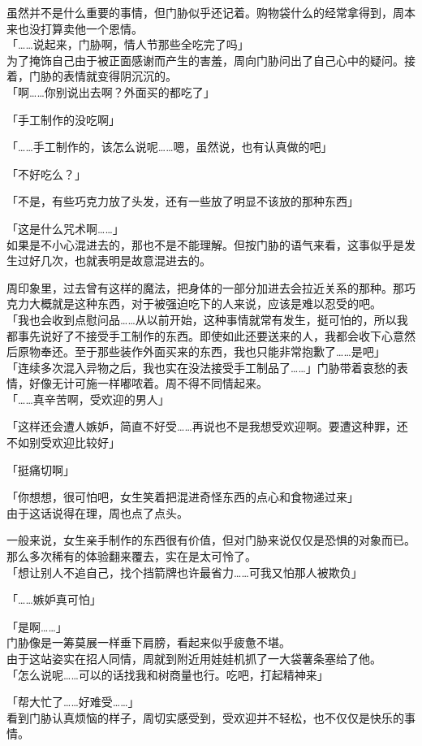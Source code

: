 虽然并不是什么重要的事情，但门胁似乎还记着。购物袋什么的经常拿得到，周本来也没打算卖他一个恩情。\\

「……说起来，门胁啊，情人节那些全吃完了吗」\\

为了掩饰自己由于被正面感谢而产生的害羞，周向门胁问出了自己心中的疑问。接着，门胁的表情就变得阴沉沉的。\\

「啊……你别说出去啊？外面买的都吃了」

「手工制作的没吃啊」

「……手工制作的，该怎么说呢……嗯，虽然说，也有认真做的吧」

「不好吃么？」

「不是，有些巧克力放了头发，还有一些放了明显不该放的那种东西」

「这是什么咒术啊……」\\

如果是不小心混进去的，那也不是不能理解。但按门胁的语气来看，这事似乎是发生过好几次，也就表明是故意混进去的。

周印象里，过去曾有这样的魔法，把身体的一部分加进去会拉近关系的那种。那巧克力大概就是这种东西，对于被强迫吃下的人来说，应该是难以忍受的吧。\\

「我也会收到点慰问品……从以前开始，这种事情就常有发生，挺可怕的，所以我都事先说好了不接受手工制作的东西。即使如此还要送来的人，我都会收下心意然后原物奉还。至于那些装作外面买来的东西，我也只能非常抱歉了……是吧」\\

「连续多次混入异物之后，我也实在没法接受手工制品了……」门胁带着哀愁的表情，好像无计可施一样嘟哝着。周不得不同情起来。\\

「……真辛苦啊，受欢迎的男人」

「这样还会遭人嫉妒，简直不好受……再说也不是我想受欢迎啊。要遭这种罪，还不如别受欢迎比较好」

「挺痛切啊」

「你想想，很可怕吧，女生笑着把混进奇怪东西的点心和食物递过来」\\

由于这话说得在理，周也点了点头。

一般来说，女生亲手制作的东西很有价值，但对门胁来说仅仅是恐惧的对象而已。那么多次稀有的体验翻来覆去，实在是太可怜了。\\

「想让别人不追自己，找个挡箭牌也许最省力……可我又怕那人被欺负」

「……嫉妒真可怕」

「是啊……」\\

门胁像是一筹莫展一样垂下肩膀，看起来似乎疲惫不堪。\\

由于这站姿实在招人同情，周就到附近用娃娃机抓了一大袋薯条塞给了他。\\

「怎么说呢……可以的话找我和树商量也行。吃吧，打起精神来」

「帮大忙了……好难受……」\\

看到门胁认真烦恼的样子，周切实感受到，受欢迎并不轻松，也不仅仅是快乐的事情。
